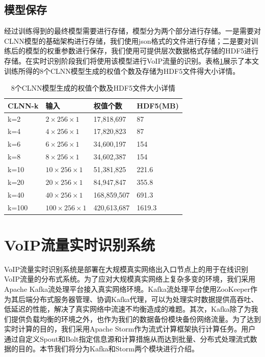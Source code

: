 \subsection{模型保存}
经过训练得到的最终模型需要进行存储，模型分为两个部分进行存储。一是需要对CLNN模型的基础架构进行存储，我们使用json格式的文件进行存储；二是要对训练后的模型的权重参数进行保存，我们使用可提供层次数据格式存储的HDF5进行存储。在实时识别阶段我们将使用该模型进行VoIP流量的识别。表格\ref{tab:params}展示了本文训练所得的8个CLNN模型生成的权值个数及存储为HDF5文件得大小详情。

\begin{table}
  \caption{8个CLNN模型生成的权值个数及HDF5文件大小详情}
  \label{tab:params}
  \centering
  \begin{tabular}{l l l l}
    \hline
    \textbf{CLNN-k} & \textbf{输入} & \textbf{权值个数}&\textbf{HDF5(MB)}\\
    \hline
    k=2      & ${2 \times 256 \times 1}$  & 17,818,697  &87  \\
    k=4      & ${4 \times 256 \times 1}$  & 17,820,823  &87  \\
    k=6      & ${6 \times 256 \times 1}$  & 34,600,197  &154  \\
    k=8      & ${8 \times 256 \times 1}$  & 34,602,387  &154 \\
    k=10     & ${10 \times 256 \times 1}$  & 51,381,825  &221.6  \\
    k=20     & ${20 \times 256 \times 1}$  & 84,947,847  &355.8 \\
    k=40     & ${40 \times 256 \times 1}$  & 168,859,507  &691.3  \\
    k=100    & ${100 \times 256 \times 1}$  & 420,613,687  &1619.3  \\
    \hline
  \end{tabular}
\end{table}

\section{VoIP流量实时识别系统}
VoIP流量实时识别系统是部署在大规模真实网络出入口节点上的用于在线识别VoIP流量的分布式系统。为了应对大规模真实网络上复杂多变的环境，我们采用Apache Kafka流处理平台接入真实网络环境。Kafka流处理平台使用ZooKeeper作为其后端分布式服务器管理、协调Kafka代理，可以为处理实时数据提供高吞吐、低延迟的性能，解决了真实网络中流速不均衡造成的难题。其次，Kafka除了为我们提供负载均衡的环境之外，也作为我们的数据备份模块备份网络流量。为了达到实时计算的目的，我们采用Apache Storm作为流式计算框架执行计算任务。用户通过自定义Spout和Bolt指定信息源和计算措施从而达到批量、分布式处理流式数据的目的。本节我们将分为Kafka和Storm两个模块进行介绍。

